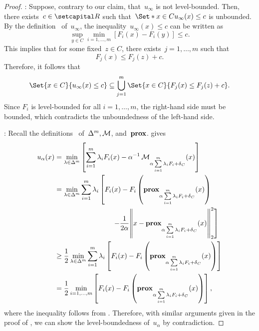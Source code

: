 \documentclass[../main]{subfiles}
\begin{document}
\begin{proof}
    : Suppose, contrary to our claim, that~$u_\infty$ is not level-bounded.
    Then, there exists~$c \in \setR$ such that~$\Set*{ x \in C }{ u_\infty(x) \le c }$ is unbounded.
    By the definition~ of~$u_\infty$, the inequality~$u_\infty(x) \le c$ can be written as
    \begin{equation}
        \sup_{y \in C} \min_{i = 1, \dots, m} [ F_i(x) - F_i(y) ] \le c.
    \end{equation}
    This implies that for some fixed~$z \in C$, there exists~$j = 1, \dots, m$ such that
    \begin{equation}
        F_j(x) \le F_j(z) + c.
    \end{equation}
    Therefore, it follows that
    \begin{equation}
        \Set{ x \in C}{ u_\infty(x) \le c } \subseteq \bigcup_{j = 1}^m \Set{ x \in C }{ F_j(x) \le F_j(z) + c }.
    \end{equation}
    Since $F_i$ is level-bounded for all $i = 1, \dots, m$, the right-hand side must be bounded, which contradicts the unboundedness of the left-hand side.

    : Recall the definitions~ of~$\Delta^m,\operatorname{\mathcal{M}}$, and~$\operatorname{\mathbf{prox}}$.
     gives
    \begin{equation}
        \begin{aligned}
            u_\alpha(x) & = \min_{\lambda \in \Delta^m} \left[ \sum_{i = 1}^{m} \lambda_i F_i(x) - \alpha^{-1} \envelope_{\alpha \sum\limits_{i = 1}^{m} \lambda_i F_i + \indicator_C}(x) \right]                 \\
                        & \begin{multlined}
                              = \min_{\lambda \in \Delta^m} \sum_{i = 1}^{m} \lambda_i \left[ F_i(x) - F_i\left( \prox_{\alpha \sum\limits_{i = 1}^{m} \lambda_i F_i + \indicator_C}(x) \right) \right. \\
                                  \left.- \frac{1}{2 \alpha} \norm*{x - \prox_{\alpha \sum\limits_{i = 1}^{m} \lambda_i F_i + \indicator_C}(x)}_2^2 \right]
                          \end{multlined}                                                                              \\
                        & \ge \frac{1}{2} \min_{\lambda \in \Delta^m} \sum_{i = 1}^{m} \lambda_i \left[ F_i(x) - F_i\left( \prox_{\alpha \sum\limits_{i = 1}^{m} \lambda_i F_i + \indicator_C}(x) \right) \right] \\
                        & = \frac{1}{2} \min_{i = 1, \dots, m} \left[ F_i(x) - F_i\left( \prox_{\alpha \sum\limits_{i = 1}^{m} \lambda_i F_i + \indicator_C}(x) \right) \right]
            ,\end{aligned}
    \end{equation}
    where the inequality follows from .
    Therefore, with similar arguments given in the proof of , we can show the level-boundedness of~$u_\alpha$ by contradiction.


\end{proof}
\end{document}
